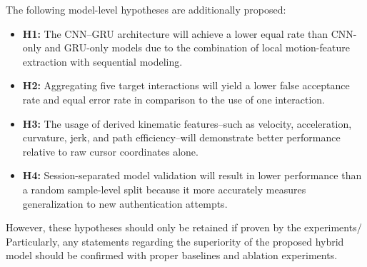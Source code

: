 \documentclass[conference]{IEEEtran}
\begin{document}
The following model-level hypotheses are additionally proposed:

\begin{itemize}
\item \textbf{H1:} The CNN--GRU architecture will achieve a lower equal rate than CNN-only and GRU-only models due to the combination of local motion-feature extraction with sequential modeling. 

\item \textbf{H2:} Aggregating five target interactions will yield a lower false acceptance rate and equal error rate in comparison to the use of one interaction. 

\item \textbf{H3:} The usage of derived kinematic features--such as velocity, acceleration, curvature, jerk, and path efficiency--will demonstrate better performance relative to raw cursor coordinates alone. 

\item \textbf{H4:} Session-separated model validation will result in lower performance than a random sample-level split because it more accurately measures generalization to new authentication attempts.
\end{itemize}

However, these hypotheses should only be retained if proven by the experiments/ Particularly, any statements regarding the superiority of the proposed hybrid model should be confirmed with proper baselines and ablation experiments. 
\end{document}
